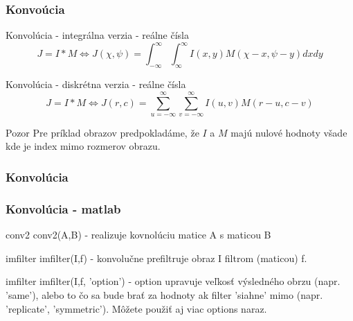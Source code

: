 \documentclass{beamer}
\begin{document}
\begin{frame}
\frametitle{Konvoúcia}
\begin{block}{Konvolúcia - integrálna verzia - reálne čísla}
\begin{equation*}
J= I \ast M \iff J (\chi, \psi) = \int_{-\infty}^{\infty}\int_{\infty}^{\infty} I(x,y)M(\chi - x,\psi - y) dx dy
\end{equation*}
\end{block}

\begin{block}{Konvolúcia - diskrétna verzia - reálne čísla}
\begin{equation*}
J = I \ast M \iff J(r,c) = \sum_{u=-\infty}^{\infty}\sum_{v=-\infty}^{\infty} I(u,v)M(r-u,c-v)
\end{equation*}
\end{block}

  \begin{alertblock}{Pozor}
  Pre príklad obrazov predpokladáme, že $I$ a $M$ majú nulové hodnoty všade kde je index mimo rozmerov obrazu.
  \end{alertblock} 

\end{frame}

\begin{frame}
\frametitle{Konvolúcia}
\noindent{}
\end{frame}

\begin{frame}
\frametitle{Konvolúcia - matlab}
\begin{block}{conv2}
conv2(A,B) - realizuje kovnolúciu matice A s maticou B
\end{block}

\begin{block}{imfilter}
imfilter(I,f) - konvolučne prefiltruje obraz I filtrom (maticou) f.
\end{block}

\begin{block}{imfilter}
imfilter(I,f, 'option') - option upravuje veľkosť výsledného obrzu (napr. 'same'), alebo to čo sa bude brať za hodnoty ak filter 'siahne' mimo (napr. 'replicate', 'symmetric'). Môžete použiť aj viac options naraz.
\end{block}
\end{frame}
\end{document}
